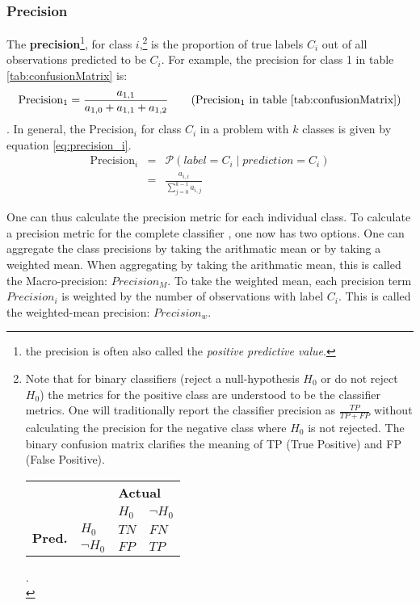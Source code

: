 \subsubsection{Precision}

The \textbf{precision}\footnote{the precision is often also called the \textit{positive predictive value}.}, for class $i$,\footnote{
    Note that for binary classifiers (reject a null-hypothesis $H_0$ or do not reject $H_0$) the metrics for the positive class are understood to be the classifier metrics. 
    One will traditionally report the classifier precision as $\frac{TP}{TP+FP}$ without calculating the precision for the negative class where $H_0$ is not rejected.
    The binary confusion matrix clarifies the meaning of TP (True Positive) and FP (False Positive).
    \begin{tabular}{clll}
        \multicolumn{1}{l}{}                &                        & \multicolumn{2}{l}{\textbf{Actual}}           \\
        \multicolumn{1}{l}{}                &                        & $H_0$   & $\neg H_0$                         \\ \cline{3-4} 
        \multirow{2}{*}{\textbf{Pred.}}   & \multicolumn{1}{l|}{$H_0$} & $TN$ & \multicolumn{1}{l|}{$FN$} \\
                                            & \multicolumn{1}{l|}{$\neg H_0$} & $FP$  & \multicolumn{1}{l|}{$TP$ } \\ \hline
        \end{tabular}.\\
} is the proportion of true labels $C_i$ out of all observations predicted to be $C_i$. 
For example, the precision for class 1 in table \ref{tab:confusionMatrix} is:
\begin{equation}
    \text{Precision}_1 = \frac{a_{1,1}}{a_{1,0} + a_{1,1} + a_{1, 2}} \tag{Precision$_1$ in table \ref{tab:confusionMatrix}}
\end{equation}.
In general, the Precision$_i$ for class $C_i$ in a problem with $k$ classes is given by equation \ref{eq:precision_i}.
\begin{eqnarray}
    \text{Precision}_i &=& \mathcal{P} \left( label = C_i \mid prediction = C_i \right) \\
    &=& \frac{a_{i, i}}{\sum_{j=0}^{k-1} a_{i, j}} \label{eq:precision_i}
\end{eqnarray}

One can thus calculate the precision metric for each individual class. 
To calculate a precision metric for the complete classifier
, one now has two options.
One can aggregate the class precisions by taking the arithmatic mean or by taking a weighted mean.
When aggregating by taking the arithmatic mean, this is called the Macro-precision: $Precision_M$.
To take the weighted mean, each precision term $Precision_i$ is weighted by the number of observations with label $C_i$. 
This is called the weighted-mean precision: $Precision_w$.

